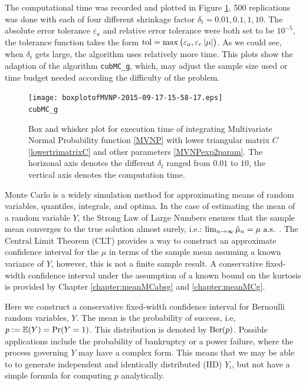 \documentclass{iitthesis}
\theoremstyle{definition}
\begin{document}
The computational time was recorded and plotted in Figure \ref{fig:MVNPadaptivitiy}. 500 replications was done with each of four different shrinkage factor $\delta_t =  0.01,0.1, 1, 10$. The absolute error tolerance $\varepsilon_a$  and relative error tolerance were both set to be $10^{-5}$, the tolerance function takes the form $\operatorname{tol} = \max \left(\varepsilon_a,\varepsilon_r \left \lvert \mu \right \rvert\right)$. As we could see, when $\delta_t$ gets large, the algorithm uses relatively more time. This plots show the adaption of the algorithm {\tt cubMC\_g}, which, may adjust the sample size used or time budget needed according the difficulty of the problem.

\begin{figure}
\centering
 \texttt{[image: boxplotofMVNP-2015-09-17-15-58-17.eps]} \\ {\tt cubMC\_g} 
\caption{Box and whisker plot for execution time of integrating Multivariate Normal Probability function \eqref{MVNP} with
lower triangular matrix $C$ \eqref{lowertrimatrixC} and other parameters \eqref{MVNPexp2param}. The horizonal axis denotes the different $\delta_t$ ranged from $0.01$ to $10$, the vertical axis denotes the computation time. \label{fig:MVNPadaptivitiy} }
\end{figure}

\label{chapter:meanMCberg}

Monte Carlo is a widely simulation method for approximating means of random variables, quantiles, integrals, and optima. In the case of estimating the mean of a random variable $Y$, the Strong Law of Large Numbers ensures that the sample mean converges to the true solution almost surely, i.e.: $\lim_{n \to \infty} \hat{\mu}_n =\mu \text{ a.s.}$ \cite[Theorem 20.1]{JP04}.  The Central Limit Theorem (CLT) provides a way to construct an approximate confidence interval for the $\mu$ in terms of the sample mean assuming a known variance of $Y$, however, this is not a finite sample result.  A conservative fixed-width confidence interval under the assumption of a known bound on the kurtosis is provided by Chapter \ref{chapter:meanMCabsg} and \ref{chapter:meanMCg}.

Here we construct a conservative fixed-width confidence interval for Bernoulli random variables, $Y$. The mean is the probability of success, i.e,  $p:= \mathbb{E}(Y)=\Pr(Y=1)$. This distribution is denoted by $\operatorname{Ber}(p)$.  Possible applications include the probability of bankruptcy or a power failure, where the process governing $Y$ may have a complex form.  This means that we may be able to to generate independent and identically distributed (IID) $Y_i$, but not have a simple formula for computing $p$ analytically. 
\end{document}
